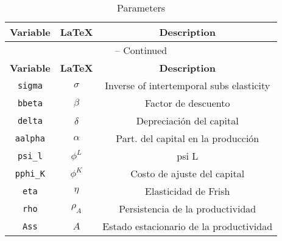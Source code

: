 \begin{center}
\begin{longtable}{ccc}
\caption{Parameters}\\%
\hline%
\multicolumn{1}{c}{\textbf{Variable}} &
\multicolumn{1}{c}{\textbf{\LaTeX}} &
\multicolumn{1}{c}{\textbf{Description}}\\%
\hline\hline%
\endfirsthead
\multicolumn{3}{c}{{\tablename} \thetable{} -- Continued}\\%
\hline%
\multicolumn{1}{c}{\textbf{Variable}} &
\multicolumn{1}{c}{\textbf{\LaTeX}} &
\multicolumn{1}{c}{\textbf{Description}}\\%
\hline\hline%
\endhead
\texttt{sigma} & $\sigma$ & Inverse of intertemporal subs elasticity\\
\texttt{bbeta} & $\beta$ & Factor de descuento\\
\texttt{delta} & $\delta$ & Depreciación del capital\\
\texttt{aalpha} & $\alpha$ & Part. del capital en la producción\\
\texttt{psi\_l} & $\phi^{L}$ & psi L\\
\texttt{pphi\_K} & $\phi^{K}$ & Costo de ajuste del capital\\
\texttt{eta} & $\eta$ & Elasticidad de Frish\\
\texttt{rho} & $\rho_{A}$ & Persistencia de la productividad\\
\texttt{Ass} & $A$ & Estado estacionario de la productividad\\
\hline%
\end{longtable}
\end{center}
